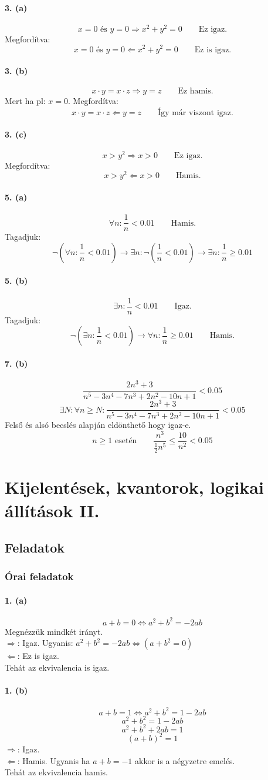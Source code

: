 \documentclass[12pt,a4paper,fleqn]{article}
\newcommand{\myparagraph}[1]{\paragraph{#1}\mbox{}}
\begin{document}
\myparagraph{3. (a)}
\[ x = 0 \text{ és } y = 0 \Rightarrow x^2 + y^2 = 0 \qquad \text{Ez igaz.} \]
Megfordítva:
\[ x = 0 \text{ és } y = 0 \Leftarrow x^2 + y^2 = 0 \qquad \text{Ez is igaz.} \]

\myparagraph{3. (b)}
\[ x \cdot y = x \cdot z \Rightarrow y = z \qquad \text{Ez hamis.} \]
Mert ha pl: $x = 0$. Megfordítva:
\[ x \cdot y = x \cdot z \Leftarrow y = z \qquad \text{Így már viszont igaz.} \]

\myparagraph{3. (c)}
\[ x > y^2 \Rightarrow x > 0 \qquad \text{Ez igaz.} \]
Megfordítva:
\[ x > y^2 \Leftarrow x > 0 \qquad \text{Hamis.} \]

\myparagraph{5. (a)}
\[ \forall n : \frac{1}{n} < 0.01 \qquad \text{Hamis.} \]
Tagadjuk:
\[
  \neg(\forall n : \frac{1}{n} < 0.01)
  \rightarrow \exists n: \neg(\frac{1}{n} < 0.01)
  \rightarrow \exists n : \frac{1}{n} \geq 0.01
\]

\myparagraph{5. (b)}
\[ \exists n : \frac{1}{n} < 0.01 \qquad \text{Igaz.} \]
Tagadjuk:
\[ \neg (\exists n : \frac{1}{n} < 0.01) \rightarrow
  \forall n : \frac{1}{n} \geq 0.01 \qquad \text{Hamis.} \]

\myparagraph{7. (b)}
\[ \dfrac{2n^3+3}{n^5-3n^4-7n^3+2n^2-10n+1} < 0.05 \]
\[
  \exists N : \forall n \geq N : \dfrac{2n^3+3}{n^5-3n^4-7n^3+2n^2-10n+1} < 0.05
\]
Felső és alsó becslés alapján eldönthető hogy igaz-e.
\[ n \geq 1 \text{ esetén} \qquad \frac{n^3}{\frac{1}{2}n^5} \leq \frac{10}{n^2} < 0.05\]


\clearpage
\section{Kijelentések, kvantorok, logikai állítások II.}
\setcounter{subsection}{1}
\subsection{Feladatok}
\subsubsection{Órai feladatok}

\myparagraph{1. (a)}
\[ a + b = 0 \iff a^2 + b^2 = -2ab \]
Megnézzük mindkét irányt. \\
$\Rightarrow$: Igaz. Ugyanis: $a^2 + b^2 = -2ab \iff (a+b^2 = 0)$ \\
$\Leftarrow$: Ez is igaz. \\
Tehát az ekvivalencia is igaz.

\myparagraph{1. (b)}
\[ a + b = 1 \iff a^2 + b^2 = 1 - 2ab \]
\[ a^2 + b^2 = 1 - 2ab \]
\[ a^2 + b^2 + 2ab = 1 \]
\[ (a+b)^2 = 1 \]
$\Rightarrow$: Igaz. \\
$\Leftarrow$: Hamis. Ugyanis ha $a+b=-1$ akkor is a négyzetre emelés. \\
Tehát az ekvivalencia hamis.
\end{document}
